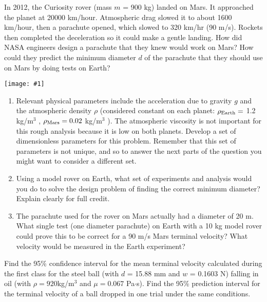 \documentclass[12pt,letterpaper]{hmcpset}
\newcommand{\diagram}[2]{\begin{center}\texttt{[image: \#1]}\end{center}}
\begin{document}
\begin{problem}[4]
	In 2012, the Curiosity rover (mass $m$ = 900 kg) landed on Mars. It approached the planet
	at 20000 km/hour. Atmospheric drag slowed it to about 1600 km/hour, then a parachute
	opened, which slowed to 320 km/hr (90 m/s). Rockets then completed the deceleration so it
	could make a gentle landing. How did NASA engineers design a parachute that they knew
	would work on Mars? How could they predict the minimum diameter $d$ of the parachute that
	they should use on Mars by doing tests on Earth?
	\diagram{Rover}{2}
	\begin{enumerate}
		\item Relevant physical parameters include the acceleration due to gravity $g$ and the atmospheric
		density $\rho$ (considered constant on each planet: $\rho_{\textnormal{Earth}} =$ 1.2 kg/m$^3$
		, $\rho_{\textnormal{Mars}} = 0.02$ kg/m$^3$
		).
		The atmospheric viscosity is not important for this rough analysis because it is low on
		both planets. Develop a set of dimensionless parameters for this problem. Remember
		that this set of parameters is not unique, and so to answer the next parts of the question
		you might want to consider a different set.
		
		\item Using a model rover on Earth, what set of experiments and analysis would you do to
		solve the design problem of finding the correct minimum diameter? Explain clearly for
		full credit.
		
		\item The parachute used for the rover on Mars actually had a diameter of 20 m. What
		single test (one diameter parachute) on Earth with a 10 kg model rover could prove this
		to be correct for a 90 m/s Mars terminal velocity? What velocity would be measured in
		the Earth experiment?
	\end{enumerate}
\end{problem}

\begin{solution}
	\vfill
\end{solution}

\newpage

\begin{problem}[5]
	Find the 95\% confidence interval for the mean terminal velocity calculated during the first
	class for the steel ball (with $d$ = 15.88 mm and $w$ = 0.1603 N) falling in oil (with $\rho =
	920 $kg/m$^3$ and $\mu = 0.067$ Pa$\cdot$s). Find the 95\% prediction interval for the terminal velocity of
	a ball dropped in one trial under the same conditions.
\end{problem}
\end{document}
